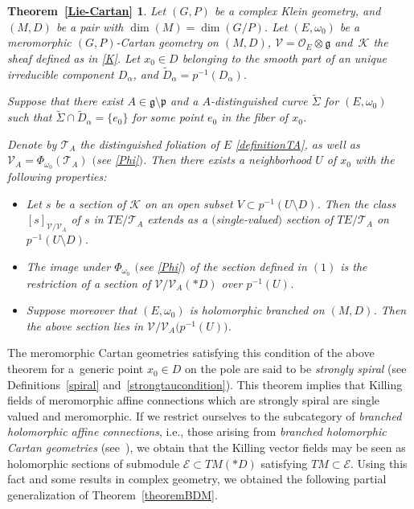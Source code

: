 \documentclass[10pt,a4paper]{amsart}
\numberwithin{equation}{section}
\newtheorem*{Theorem-4.2}{Theorem~\ref{Lie-Cartan}}
\begin{document}
\begin{Theorem-4.2}\label{Lie-Cartan-Int}
Let $(G,P)$ be a complex Klein geometry, and $(M,D)$ be a pair with $\dim(M)=\dim(G/P)$. Let $(E,\omega_0)$ be a meromorphic $(G,P)$-Cartan geometry on $(M,D)$, $\mathcal{V}=\mathcal{O}_E\otimes \mathfrak{g}$ and~$\mathcal{K}$ the sheaf defined as in \eqref{K}. Let $x_0 \in D$ belonging to the smooth part of an unique irreducible component $D_\alpha$, and $\tilde{D}_\alpha = p^{-1}(D_\alpha)$.

Suppose that there exist $A\in \mathfrak{g}\setminus \mathfrak{p}$ and a $A$-distinguished curve $\tilde{\Sigma}$ for $(E,\omega_0)$ such that $\tilde{\Sigma}\cap \tilde{D}_\alpha= \{e_0\}$ for some point $e_0$ in the fiber of $x_0$.

Denote by $\mathcal{T}_A$ the distinguished foliation of $E$ \eqref{definitionTA}, as well as $\mathcal{V}_A=\Phi_{\omega_0}(\mathcal{T}_A)$ $($see \eqref{Phi}$)$. Then there exists a neighborhood $U$ of $x_0$ with the following properties:
\begin{itemize}\itemsep=0pt
\item[$(1)$] Let $s$ be a section of $\mathcal{K}$ on an open subset $V\subset p^{-1}(U\setminus D)$. Then the class $[s]_{\mathcal{V}/\mathcal{V}_A}$ of $s$ in $TE/\mathcal{T}_A$ extends as a $($single-valued$)$ section of $TE/\mathcal{T}_A$ on $p^{-1}(U\setminus D)$.
 \item[$(2)$] The image under $\Phi_{\omega_0}$ $($see \eqref{Phi}$)$ of the section defined in $(1)$ is the restriction of a section of $\mathcal{V}/\mathcal{V}_A(* D)$ over $p^{-1}(U)$.
\item[$(3)$] Suppose moreover that $(E,\omega_0)$ is holomorphic branched on $(M,D)$. Then the above section lies in $\mathcal{V}/\mathcal{V}_A\big(p^{-1}(U)\big)$. \end{itemize}
\end{Theorem-4.2}

 The meromorphic Cartan geometries satisfying this condition of the above theorem for a~generic point $x_0\in D$ on the pole are said to be \textit{strongly spiral} (see Definitions~\ref{spiral} and~\ref{strongtaucondition}). This theorem implies that Killing fields of meromorphic affine connections which are strongly spiral are single valued and meromorphic. If we restrict ourselves to the subcategory of \textit{branched holomorphic affine connections}, i.e., those arising from \textit{branched holomorphic Cartan geometries} (see~\cite{BD}), we obtain that the Killing vector fields may be seen as holomorphic sections of submodule $\mathcal{E}\subset TM(* D)$ satisfying $TM\subset \mathcal{E}$. Using this fact and some results in complex geometry, we obtained the following partial generalization of Theorem~\ref{theoremBDM}.
\end{document}
